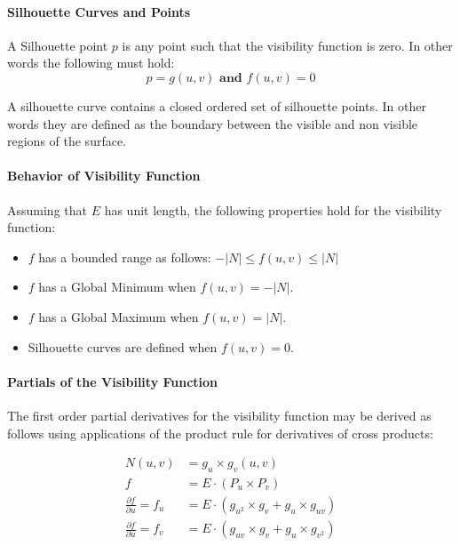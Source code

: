 \documentclass[12pt, letterpaper]{article}
\begin{document}
		\paragraph{Silhouette Curves and Points}

		A Silhouette point $p$ is any point such that the visibility function is zero. In other words the following must hold:
		$$p = g(u, v) \textbf{ and } f(u, v) = 0$$

		A silhouette curve contains a closed ordered set of silhouette points. In other words they are defined as the boundary between the visible and non visible regions of the surface.

		\paragraph{Behavior of Visibility Function}

			Assuming that $E$ has unit length, the following properties hold for the visibility function:

			\begin{itemize}
			\item $f$ has a bounded range as follows: $-|N| \le f(u, v) \le |N|$
			\item $f$ has a Global Minimum when $f(u, v) = -|N|$.
			\item $f$ has a Global Maximum when $f(u, v) = |N|$.
			\item Silhouette curves are defined when $f(u, v) = 0$.
			\end{itemize}

		\paragraph{Partials of the Visibility Function}

			The first order partial derivatives for the visibility function may be derived as follows using applications of the product rule for derivatives of cross products:

			\begin{align*}
			N(u, v) &= g_{u} \times g_{v} (u, v)\\
			f  &= E \cdot (P_{u} \times P_{v})\\
			\frac{\partial f}{\partial u} = f_{u} &= E \cdot (g_{u^{2}} \times g_{v} + g_{u} \times g_{uv})\\
			\frac{\partial f}{\partial u} = f_{v} &= E \cdot (g_{uv} \times g_{v} + g_{u} \times g_{v^{2}})\\
			\end{align*}
\end{document}
